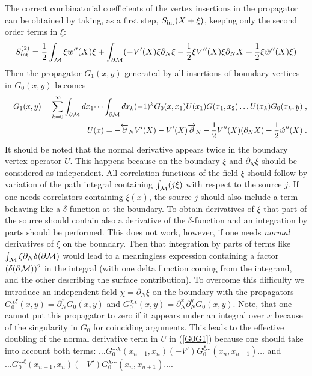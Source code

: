 \documentclass[a4paper,12pt]{article}
\begin{document}
The correct combinatorial coefficients of the vertex insertions in
the propagator can be obtained by taking, as a first step,  
$S_{{\mbox {\scriptsize {int}}}}(\bar X +\xi )$,  keeping 
only the second order terms in $\xi$:
\begin{equation}
S^{(2)}_{{\mbox {\scriptsize {int}}}}=
\frac 12 \int_{\cal M} \xi w''(\bar X) \xi 
+\int_{\partial {\cal M}} (-V'(\bar X) \xi\partial_N \xi
-\frac 12 \xi V''(\bar X)\xi \partial_N \bar X
+\frac 12 \xi \hat w''(\bar X) \xi ) 
\label{S2int}
\end{equation}
Then the propagator $G_1(x,y)$ generated by all
insertions of boundary vertices in $G_0(x,y)$ becomes 
\begin{eqnarray}
&&G_1(x,y)=\sum_{k=0}^\infty \int_{\partial {\cal M}}dx_1 \dots
\int_{\partial {\cal M}}dx_k
(-1)^k G_0(x,x_1)U(x_1)G(x_1,x_2)\dots
U(x_k)G_0(x_k,y)\; , \nonumber \\
&&U(x)=-\overleftarrow{\partial}_NV'(\bar X)
-V'(\bar X)\overrightarrow{\partial}_N -\frac 12 V''(\bar X)
(\partial_N\bar X)
+\frac 12 \hat w''(\bar X) \; .
\label{G0G1}
\end{eqnarray}
It should be noted that the normal derivative appears twice in the
boundary vertex operator $U$. This happens because
on the boundary $\xi$ and $\partial_N\xi$ should be
considered as independent.  All correlation functions of the
field $\xi$ should follow by variation of the path
integral containing $\int_{\cal M} (j\xi )$ with
respect to the source $j$. If one needs correlators
containing $\xi (x)$, the source $j$ should also include a 
term behaving like a $\delta$-function at the boundary. 
To obtain derivatives of
$\xi$ that part of 
the source should contain also a derivative of the
$\delta$-function and an integration by parts should be performed.
This does not work, however, if one needs {\it normal}
derivatives of $\xi$ on the boundary. Then that integration
by parts of terms like $\int_{\cal M}\xi \partial_N 
\delta (\partial{\cal M})$  would lead to
a meaningless expression containing a factor 
$(\delta (\partial{\cal M}))^2$ in the integral 
(with one delta function coming from the integrand, and the other
describing the surface contribution). To overcome this difficulty we 
introduce an independent field 
$\chi =\partial_N \xi$ on 
the boundary with the propagators $G_0^{\chi \xi}(x,y)=
\partial^x_N G_0(x,y)$ and $G_0^{\chi \chi}(x,y)=
\partial^x_N \partial_N^yG_0(x,y)$. Note, that one cannot put this
propagator to zero if it appears under an integral over
$x$ because of the singularity in $G_0$ for coinciding
arguments. This leads to the effective doubling of the
normal derivative term in $U$ in (\ref{G0G1}) because one
should take into account both terms: $\dots G_0^{\dots \chi}
(x_{n-1},x_n)(-V')G_0^{\xi\dots}(x_{n},x_{n+1})\dots$
and $\dots G_0^{\dots \xi}
(x_{n-1},x_n)(-V')G_0^{\chi\dots}(x_{n},x_{n+1})\dots$.
\end{document}
